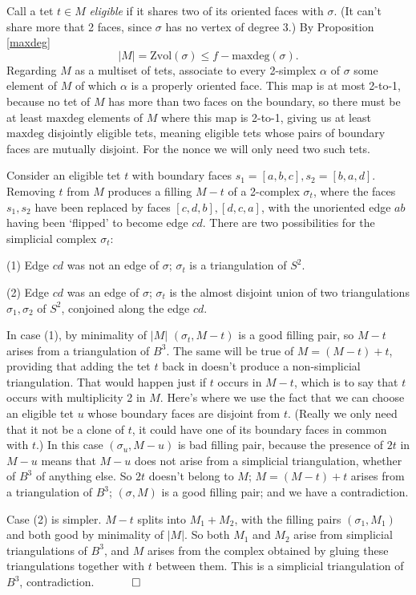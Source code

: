 \documentclass[12pt]{article}
\newcommand{\proofend}{$\quad \qed$}
\newcommand{\kw}{\mathrm}
\newcommand{\maxdeg}{\kw{maxdeg}}
\newcommand{\Zvol}{\kw{Zvol}}
\begin{document}
Call a tet $t \in M$ \emph{eligible} if it shares two of its oriented faces
with $\sigma$. (It can't share more that 2 faces,
since $\sigma$ has no vertex of
degree $3$.)
By Proposition \ref{maxdeg}
\[
|M| = \Zvol(\sigma) \leq f-\maxdeg(\sigma) 
.
\]
Regarding $M$ as a multiset of tets, associate to every 2-simplex $\alpha$ of
$\sigma$ some element of $M$ of which $\alpha$ is a properly oriented face.
This map is at most 2-to-1, because no tet of $M$ has more than two faces
on the boundary,
so there must be at least $\maxdeg$ elements of $M$ where this map is 2-to-1,
giving us at least $\maxdeg$ disjointly eligible tets,
meaning eligible tets  whose pairs of boundary faces
are mutually disjoint.
For the nonce we will only need two such tets.

Consider an eligible tet $t$ with boundary faces
$s_1=[a,b,c],s_2=[b,a,d]$.
Removing $t$ from $M$ produces a filling $M-t$
of a 2-complex $\sigma_t$, where the faces $s_1,s_2$ have been replaced
by faces $[c,d,b],[d,c,a]$,
with the unoriented edge $ab$ having been `flipped' to become edge $cd$.
There are two possibilities for the simplicial complex $\sigma_t$:

(1) Edge $cd$ was not an edge of $\sigma$;
$\sigma_t$ is a triangulation of $S^2$.

(2) Edge $cd$ was an edge of $\sigma$;
$\sigma_t$ is the almost disjoint union of two triangulations
$\sigma_1,\sigma_2$ of $S^2$, conjoined along the edge $cd$.


In case (1), by minimality of $|M|$
$(\sigma_t,M-t)$ is a good filling pair,
so $M-t$ arises from a triangulation of $B^3$.
The same will be true of $M = (M-t) + t$,
providing that adding the tet $t$ back in
doesn't produce a non-simplicial triangulation.
That would happen just if $t$ occurs in $M-t$, which is to say that
$t$ occurs with multiplicity 2 in $M$.
Here's where we use the fact that we can choose an eligible tet $u$
whose boundary faces are disjoint from $t$.
(Really we only need that it not be a clone of $t$, it could have 
one of its boundary faces in common with $t$.)
In this case $(\sigma_u, M-u)$ is bad filling pair,
because the presence of $2t$ in $M-u$ means that $M-u$ does not
arise from a simplicial triangulation, whether of $B^3$ of anything else.
So $2t$ doesn't belong to $M$; $M=(M-t)+t$ arises from a triangulation of $B^3$;
$(\sigma,M)$ is a good filling pair; and we have a contradiction.

Case (2) is simpler.
$M-t$ splits into $M_1+M_2$, with the filling pairs $(\sigma_1,M_1)$ and
both good by minimality of $|M|$.
So both $M_1$ and $M_2$ arise from simplicial triangulations of $B^3$,
and $M$ arises from the complex obtained by gluing these triangulations
together with $t$ between them.
This is a simplicial triangulation of $B^3$,
contradiction.
\proofend
\end{document}
